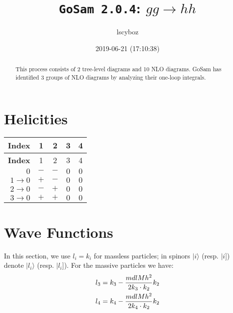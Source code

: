 \documentclass[a4paper]{article}
\title{\texttt{GoSam 2.0.4}: ${g}{g}\rightarrow{h}{h}$}
\author{lscyboz}
\date{2019-06-21 (17:10:38)}
\newcommand{\kea}[1]{\vert #1 \rangle}
\newcommand{\keb}[1]{\vert #1 ]}
\begin{document}
\maketitle
\begin{abstract}
\noindent This process consists of 2 tree-level diagrams and 10 NLO diagrams. GoSam has identified 3 groups  of NLO diagrams by analyzing their one-loop integrals.
\end{abstract}
\newpage
\tableofcontents
\newpage

\section{Helicities}

\begin{longtable}[c]{r|cccc}
\bf{Index} &1&2&3&4\\
\hline
\endfirsthead
\bf{Index} &1&2&3&4\\
\hline
\endhead 
$0$& $-$& $-$& $0$& $0$\\
$1\rightarrow 0$& $+$& $-$& $0$& $0$\\
$2\rightarrow 0$& $-$& $+$& $0$& $0$\\
$3\rightarrow 0$& $+$& $+$& $0$& $0$\\
\end{longtable}
\section{Wave Functions}
In this section, we use $l_i=k_i$ for massless particles;
in spinors $\kea{i}$ (resp. $\keb{i}$) denote $\kea{l_i}$ (resp. $\keb{l_i}$).
For the massive particles we have:
\begin{align}
l_{3} &= k_{3} - \frac{mdlMh^2}{%
      2 k_{3}\cdot k_{2}}k_{2}\\
l_{4} &= k_{4} - \frac{mdlMh^2}{%
      2 k_{4}\cdot k_{2}}k_{2}
\end{align}
\end{document}
